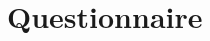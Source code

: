 \documentclass[12pt,english]{article}
\begin{document}



\clearpage
\section{Questionnaire}
\end{document}

